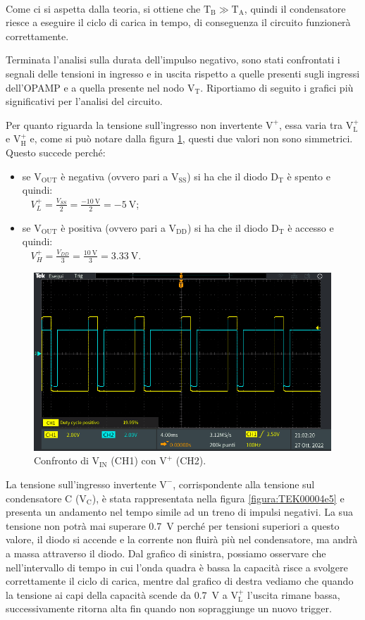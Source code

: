 \documentclass{report}
\begin{document}
\\[4pt]Come ci si aspetta dalla teoria, si ottiene che $\mathrm{T_B}\gg\mathrm{T_A}$, quindi il condensatore riesce a eseguire il ciclo di carica in tempo, di conseguenza il circuito funzionerà correttamente.\par
Terminata l'analisi sulla durata dell'impulso negativo, sono stati confrontati i segnali delle tensioni in ingresso e in uscita rispetto a quelle presenti sugli ingressi dell'OPAMP e a quella presente nel nodo $\mathrm{V_T}$. Riportiamo di seguito i grafici più significativi per l'analisi del circuito.\par
Per quanto riguarda la tensione sull'ingresso non invertente $\mathrm{V^+}$, essa varia tra $\mathrm{V_L^+}$ e $\mathrm{V_H^+}$ e, come si può notare dalla figura \ref{figura:TEK00003}, questi due valori non sono simmetrici. Questo succede perché:
\begin{itemize}
	\item se $\mathrm{V_{OUT}}$ è negativa (ovvero pari a $\mathrm{V_{SS}}$) si ha che il diodo $\mathrm{D_T}$ è spento e quindi:
	\\[4pt]$\displaystyle{\;\;\;V_L^+=\frac{V_{SS}}{2}=\frac{\SI{-10}{\volt}}{2}=\SI{-5}{\volt}}$;
	\item se $\mathrm{V_{OUT}}$ è positiva (ovvero pari a $\mathrm{V_{DD}}$) si ha che il diodo $\mathrm{D_T}$ è accesso e quindi:
	\\[4pt]$\displaystyle{\;\;\;V_H^+=\frac{V_{DD}}{3}=\frac{\SI{10}{\volt}}{3}=\SI{3.33}{\volt}}$.
\end{itemize}
\begin{figure}[h!]
	\centering
	\includegraphics[height=6.7cm]{immagini/TEK00003}
	\caption{Confronto di $\mathrm{V_{IN}}$ (CH1) con $\mathrm{V^+}$ (CH2).}
	\label{figura:TEK00003}
\end{figure}
La tensione sull'ingresso invertente $\mathrm{V^-}$, corrispondente alla tensione sul condensatore C ($\mathrm{V_C}$), è stata rappresentata nella figura \ref{figura:TEK00004e5} e presenta un andamento nel tempo simile ad un treno di impulsi negativi. La sua tensione non potrà mai superare \SI{0.7}{\volt} perché per tensioni superiori a questo valore, il diodo si accende e la corrente non fluirà più nel condensatore, ma andrà a massa attraverso il diodo. Dal grafico di sinistra, possiamo osservare che nell'intervallo di tempo in cui l'onda quadra è bassa la capacità risce a svolgere correttamente il ciclo di carica, mentre dal grafico di destra vediamo che quando la tensione ai capi della capacità scende da \SI{0.7}{\volt} a $\mathrm{V_L^+}$ l'uscita rimane bassa, successivamente ritorna alta fin quando non sopraggiunge un nuovo trigger.
\end{document}
